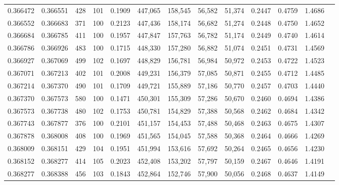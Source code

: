 \begin{tabular}{rrrrrrrrrrrrr}
0.366472 & 0.366551 &   428 & 101 &                                     0.1909 & 447,065 & 158,545 &  56,582 &  51,374 & 0.2447 & 0.4759 & 1.4686 \\
0.366552 & 0.366683 &   371 & 100 &                                     0.2123 & 447,436 & 158,174 &  56,682 &  51,274 & 0.2448 & 0.4750 & 1.4652 \\
0.366684 & 0.366785 &   411 & 100 &                                     0.1957 & 447,847 & 157,763 &  56,782 &  51,174 & 0.2449 & 0.4740 & 1.4614 \\
0.366786 & 0.366926 &   483 & 100 &                                     0.1715 & 448,330 & 157,280 &  56,882 &  51,074 & 0.2451 & 0.4731 & 1.4569 \\
0.366927 & 0.367069 &   499 & 102 &                                     0.1697 & 448,829 & 156,781 &  56,984 &  50,972 & 0.2453 & 0.4722 & 1.4523 \\
0.367071 & 0.367213 &   402 & 101 &                                     0.2008 & 449,231 & 156,379 &  57,085 &  50,871 & 0.2455 & 0.4712 & 1.4485 \\
0.367214 & 0.367370 &   490 & 101 &                                     0.1709 & 449,721 & 155,889 &  57,186 &  50,770 & 0.2457 & 0.4703 & 1.4440 \\
0.367370 & 0.367573 &   580 & 100 &                                     0.1471 & 450,301 & 155,309 &  57,286 &  50,670 & 0.2460 & 0.4694 & 1.4386 \\
0.367573 & 0.367738 &   480 & 102 &                                     0.1753 & 450,781 & 154,829 &  57,388 &  50,568 & 0.2462 & 0.4684 & 1.4342 \\
0.367743 & 0.367877 &   376 & 100 &                                     0.2101 & 451,157 & 154,453 &  57,488 &  50,468 & 0.2463 & 0.4675 & 1.4307 \\
0.367878 & 0.368008 &   408 & 100 &                                     0.1969 & 451,565 & 154,045 &  57,588 &  50,368 & 0.2464 & 0.4666 & 1.4269 \\
0.368009 & 0.368151 &   429 & 104 &                                     0.1951 & 451,994 & 153,616 &  57,692 &  50,264 & 0.2465 & 0.4656 & 1.4230 \\
0.368152 & 0.368277 &   414 & 105 &                                     0.2023 & 452,408 & 153,202 &  57,797 &  50,159 & 0.2467 & 0.4646 & 1.4191 \\
0.368277 & 0.368388 &   456 & 103 &                                     0.1843 & 452,864 & 152,746 &  57,900 &  50,056 & 0.2468 & 0.4637 & 1.4149 \\

\end{tabular}
